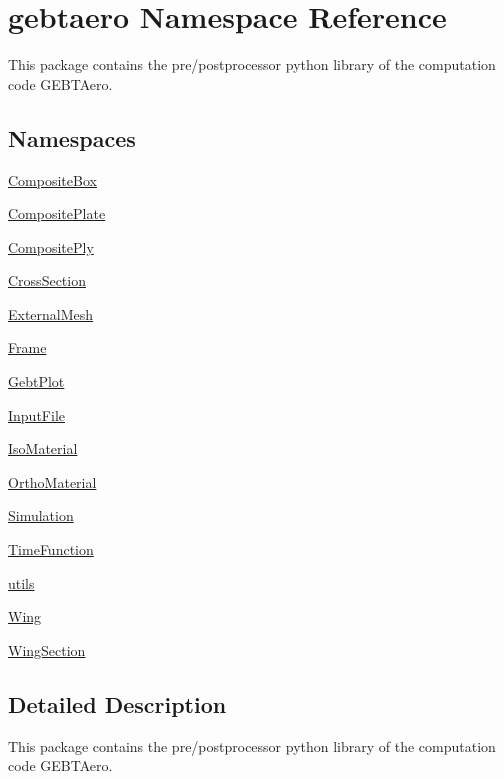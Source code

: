 \hypertarget{namespacegebtaero}{}\section{gebtaero Namespace Reference}
\label{namespacegebtaero}


This package contains the pre/postprocessor python library of the computation code G\+E\+B\+T\+Aero.  


\subsection*{Namespaces}
\begin{DoxyCompactItemize}
\item 
 \hyperlink{namespacegebtaero_1_1_composite_box}{Composite\+Box}
\item 
 \hyperlink{namespacegebtaero_1_1_composite_plate}{Composite\+Plate}
\item 
 \hyperlink{namespacegebtaero_1_1_composite_ply}{Composite\+Ply}
\item 
 \hyperlink{namespacegebtaero_1_1_cross_section}{Cross\+Section}
\item 
 \hyperlink{namespacegebtaero_1_1_external_mesh}{External\+Mesh}
\item 
 \hyperlink{namespacegebtaero_1_1_frame}{Frame}
\item 
 \hyperlink{namespacegebtaero_1_1_gebt_plot}{Gebt\+Plot}
\item 
 \hyperlink{namespacegebtaero_1_1_input_file}{Input\+File}
\item 
 \hyperlink{namespacegebtaero_1_1_iso_material}{Iso\+Material}
\item 
 \hyperlink{namespacegebtaero_1_1_ortho_material}{Ortho\+Material}
\item 
 \hyperlink{namespacegebtaero_1_1_simulation}{Simulation}
\item 
 \hyperlink{namespacegebtaero_1_1_time_function}{Time\+Function}
\item 
 \hyperlink{namespacegebtaero_1_1utils}{utils}
\item 
 \hyperlink{namespacegebtaero_1_1_wing}{Wing}
\item 
 \hyperlink{namespacegebtaero_1_1_wing_section}{Wing\+Section}
\end{DoxyCompactItemize}


\subsection{Detailed Description}
This package contains the pre/postprocessor python library of the computation code G\+E\+B\+T\+Aero. 